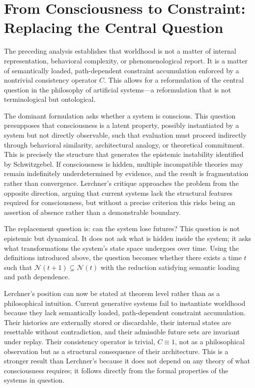 \documentclass[11pt]{article}
\theoremstyle{definition}
\theoremstyle{remark}
\begin{document}
\section{From Consciousness to Constraint: Replacing the Central Question}

The preceding analysis establishes that worldhood is not a matter of internal representation,
behavioral complexity, or phenomenological report. It is a matter of semantically loaded,
path-dependent constraint accumulation enforced by a nontrivial consistency operator $C$.
This allows for a reformulation of the central question in the philosophy of artificial
systems---a reformulation that is not terminological but ontological.

The dominant formulation asks whether a system is conscious. This question presupposes that
consciousness is a latent property, possibly instantiated by a system but not directly
observable, such that evaluation must proceed indirectly through behavioral similarity,
architectural analogy, or theoretical commitment. This is precisely the structure that
generates the epistemic instability identified by Schwitzgebel. If consciousness is hidden,
multiple incompatible theories may remain indefinitely underdetermined by evidence, and the
result is fragmentation rather than convergence. Lerchner's critique approaches the problem
from the opposite direction, arguing that current systems lack the structural features
required for consciousness, but without a precise criterion this risks being an assertion
of absence rather than a demonstrable boundary.

The replacement question is: can the system lose futures? This question is not epistemic
but dynamical. It does not ask what is hidden inside the system; it asks what transformations
the system's state space undergoes over time. Using the definitions introduced above, the
question becomes whether there exists a time $t$ such that $\mathcal{N}(t+1) \subsetneq
\mathcal{N}(t)$ with the reduction satisfying semantic loading and path dependence.

Lerchner's position can now be stated at theorem level rather than as a philosophical
intuition. Current generative systems fail to instantiate worldhood because they lack
semantically loaded, path-dependent constraint accumulation. Their histories are externally
stored or discardable, their internal states are resettable without contradiction, and their
admissible future sets are invariant under replay. Their consistency operator is trivial,
$C \equiv 1$, not as a philosophical observation but as a structural consequence of their
architecture. This is a stronger result than Lerchner's because it does not depend on any
theory of what consciousness requires; it follows directly from the formal properties of the
systems in question.
\end{document}
